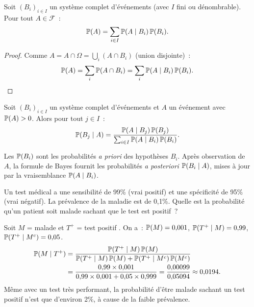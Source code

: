 \begin{theoreme}
\label{thm:prob_totales}
Soit $(B_i)_{i \in I}$ un syst\`eme complet d'\'ev\'enements (avec $I$ fini ou
d\'enombrable). Pour tout $A \in \mathcal{F}$~:
\[
    \mathbb{P}(A) = \sum_{i \in I} \mathbb{P}(A \mid B_i)\, \mathbb{P}(B_i).
\]
\end{theoreme}

\begin{proof}
Comme $A = A \cap \Omega = \bigcup_{i} (A \cap B_i)$ (union disjointe)~:
\[
    \mathbb{P}(A) = \sum_{i} \mathbb{P}(A \cap B_i) = \sum_{i} \mathbb{P}(A \mid B_i)\, \mathbb{P}(B_i). \qedhere
\]
\end{proof}

\begin{theoreme}
\label{thm:bayes}
Soit $(B_i)_{i \in I}$ un syst\`eme complet d'\'ev\'enements et $A$ un \'ev\'enement
avec $\mathbb{P}(A) > 0$. Alors pour tout $j \in I$~:
\[
    \mathbb{P}(B_j \mid A) = \frac{\mathbb{P}(A \mid B_j)\, \mathbb{P}(B_j)}{\sum_{i \in I} \mathbb{P}(A \mid B_i)\, \mathbb{P}(B_i)}.
\]
\end{theoreme}

\begin{intuition}[title=\textbf{Interpr\'etation bay\'esienne}]
Les $\mathbb{P}(B_i)$ sont les probabilit\'es \emph{a priori} des hypoth\`eses $B_i$.
Apr\`es observation de $A$, la formule de Bayes fournit les probabilit\'es
\emph{a posteriori} $\mathbb{P}(B_i \mid A)$, mises \`a jour par la vraisemblance
$\mathbb{P}(A \mid B_i)$.
\end{intuition}

\begin{exemple}
Un test m\'edical a une sensibilit\'e de 99\% (vrai positif) et une sp\'ecificit\'e
de 95\% (vrai n\'egatif). La pr\'evalence de la maladie est de 0{,}1\%. Quelle est la
probabilit\'e qu'un patient soit malade sachant que le test est positif~?

Soit $M$ = \og malade \fg et $T^+$ = \og test positif \fg. On a~:
$\mathbb{P}(M) = 0{,}001$, $\mathbb{P}(T^+ \mid M) = 0{,}99$, $\mathbb{P}(T^+ \mid M^c) = 0{,}05$.
\begin{align*}
    \mathbb{P}(M \mid T^+)
    &= \frac{\mathbb{P}(T^+ \mid M)\, \mathbb{P}(M)}{\mathbb{P}(T^+ \mid M)\, \mathbb{P}(M) + \mathbb{P}(T^+ \mid M^c)\, \mathbb{P}(M^c)} \\
    &= \frac{0{,}99 \times 0{,}001}{0{,}99 \times 0{,}001 + 0{,}05 \times 0{,}999}
    = \frac{0{,}00099}{0{,}05094}
    \approx 0{,}0194.
\end{align*}
M\^eme avec un test tr\`es performant, la probabilit\'e d'\^etre malade sachant un
test positif n'est que d'environ 2\%, \`a cause de la faible pr\'evalence.
\end{exemple}

